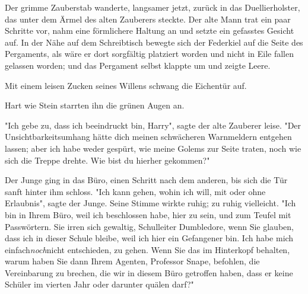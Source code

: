 {Der grimme Zauberstab wanderte, langsamer jetzt, zurück in das Duellierholster, das unter dem Ärmel des alten Zauberers steckte. Der alte Mann trat ein paar Schritte vor, nahm eine förmlichere Haltung an und setzte ein gefasstes Gesicht auf. In der Nähe auf dem Schreibtisch bewegte sich der Federkiel auf die Seite des Pergaments, als wäre er dort sorgfältig platziert worden und nicht in Eile fallen gelassen worden; und das Pergament selbst klappte um und zeigte Leere.

Mit einem leisen Zucken seines Willens schwang die Eichentür auf.

Hart wie Stein starrten ihn die grünen Augen an.

"Ich gebe zu, dass ich beeindruckt bin, Harry", sagte der alte Zauberer leise. "Der Unsichtbarkeitsumhang hätte dich meinen schwächeren Warnmeldern entgehen lassen; aber ich habe weder gespürt, wie meine Golems zur Seite traten, noch wie sich die Treppe drehte. Wie bist du hierher gekommen?"

Der Junge ging in das Büro, einen Schritt nach dem anderen, bis sich die Tür sanft hinter ihm schloss. "Ich kann gehen, wohin ich will, mit oder ohne Erlaubnis", sagte der Junge. Seine Stimme wirkte ruhig; zu ruhig vielleicht. "Ich bin in Ihrem Büro, weil ich beschlossen habe, hier zu sein, und zum Teufel mit Passwörtern. Sie irren sich gewaltig, Schulleiter Dumbledore, wenn Sie glauben, dass ich in dieser Schule bleibe, weil ich hier ein Gefangener bin. Ich habe mich einfach\emph{noch}nicht entschieden, zu gehen. Wenn Sie das im Hinterkopf behalten, warum haben Sie dann Ihrem Agenten, Professor Snape, befohlen, die Vereinbarung zu brechen, die wir in diesem Büro getroffen haben, dass er keine Schüler im vierten Jahr oder darunter quälen darf?"

}
